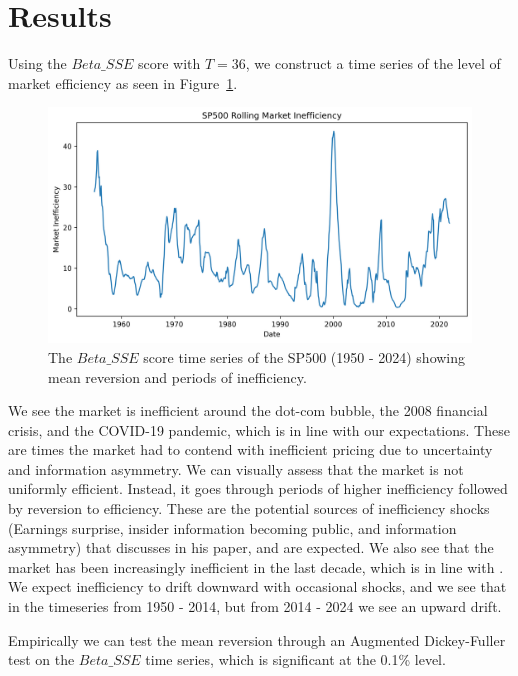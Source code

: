 \section{Results}
\label{sec:results}

Using the $Beta\_SSE$ score with $T=36$, we construct a time series of the level of market efficiency as 
seen in Figure~\ref{fig:sp_500_SSE_beta_ts}.
\begin{figure}[h!]
    \centering
    \includegraphics[width=1\textwidth]{../figs/SP500 Rolling Market Inefficiency.png}
    \caption{The $Beta\_SSE$ score time series of the SP500 (1950 - 2024) showing mean reversion and periods of inefficiency.}
    \label{fig:sp_500_SSE_beta_ts}
\end{figure}

We see the market is inefficient around the dot-com bubble, the 2008 financial crisis, and the COVID-19 pandemic, which is in line with our expectations.
These are times the market had to contend with inefficient pricing due to uncertainty and information asymmetry.
We can visually assess that the market is not uniformly efficient. Instead, it goes through periods of higher inefficiency followed by reversion to efficiency.
These are the potential sources of inefficiency shocks (Earnings surprise, insider information becoming public, and information asymmetry) that \citet{fama_EMH} discusses in his paper, and are expected.
We also see that the market has been increasingly inefficient in the last decade, which is in line with \citet{asness_2024}.
We expect inefficiency to drift downward with occasional shocks, and we see that in the timeseries from 1950 - 2014, but from 2014 - 2024 we see an upward drift.

Empirically we can test the mean reversion through an Augmented Dickey-Fuller test \citep{cheung1995lag} on the $Beta\_SSE$ time series, which is significant at the 0.1\% level.

